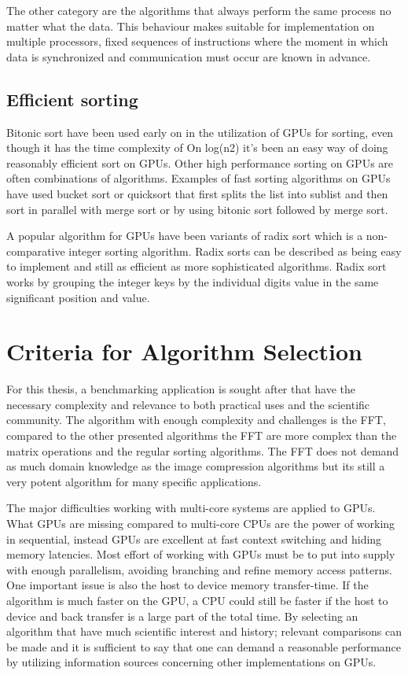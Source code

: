 The other category are the algorithms that always perform the same process no matter what the data. This behaviour makes suitable for implementation on multiple processors, fixed sequences of instructions where the moment in which data is synchronized and communication must occur are known in advance.

\subsection{Efficient sorting}
Bitonic sort have been used early on in the utilization of GPUs for sorting, even though it has the time complexity of On log(n2) it's been an easy way of doing reasonably efficient sort on GPUs. Other high performance sorting on GPUs are often combinations of algorithms. Examples of fast sorting algorithms on GPUs have used bucket sort or quicksort that first splits the list into sublist and then sort in parallel with merge sort or by using bitonic sort followed by merge sort.

A popular algorithm for GPUs have been variants of radix sort which is a non-comparative integer sorting algorithm. Radix sorts can be described as being easy to implement and still as efficient as more sophisticated algorithms. Radix sort works by grouping the integer keys by the individual digits value in the same significant position and value.

\section{Criteria for Algorithm Selection}
For this thesis, a benchmarking application is sought after that have the necessary complexity and relevance to both practical uses and the scientific community. The algorithm with enough complexity and challenges is the FFT, compared to the other presented algorithms the FFT are more complex than the matrix operations and the regular sorting algorithms. The FFT does not demand as much domain knowledge as the image compression algorithms but its still a very potent algorithm for many specific applications.

The major difficulties working with multi-core systems are applied to GPUs. What GPUs are missing compared to multi-core CPUs are the power of working in sequential, instead GPUs are excellent at fast context switching and hiding memory latencies. Most effort of working with GPUs must be to put into supply with enough parallelism, avoiding branching and refine memory access patterns. One important issue is also the host to device memory transfer-time. If the algorithm is much faster on the GPU, a CPU could still be faster if the host to device and back transfer is a large part of the total time.
By selecting an algorithm that have much scientific interest and history; relevant comparisons can be made and it is sufficient to say that one can demand a reasonable performance by utilizing information sources concerning other implementations on GPUs. 

